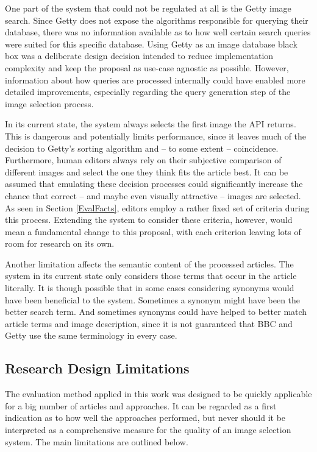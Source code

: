 \documentclass[11pt,a4paper,twoside]{article}
\begin{document}
One part of the system that could not be regulated at all is the Getty image search. Since Getty does not expose the algorithms responsible for querying their database, there was no information available as to how well certain search queries were suited for this specific database. Using Getty as an image database black box was a deliberate design decision intended to reduce implementation complexity and keep the proposal as use-case agnostic as possible. However, information about how queries are processed internally could have enabled more detailed improvements, especially regarding the query generation step of the image selection process.

In its current state, the system always selects the first image the API returns. This is dangerous and potentially limits performance, since it leaves much of the decision to Getty's sorting algorithm and -- to some extent -- coincidence. Furthermore, human editors always rely on their subjective comparison of different images and select the one they think fits the article best. It can be assumed that emulating these decision processes could significantly increase the chance that correct -- and maybe even visually attractive -- images are selected. As seen in Section \ref{EvalFacts}, editors employ a rather fixed set of criteria during this process. Extending the system to consider these criteria, however, would mean a fundamental change to this proposal, with each criterion leaving lots of room for research on its own.

Another limitation affects the semantic content of the processed articles. The system in its current state only considers those terms that occur in the article literally. It is though possible that in some cases considering synonyms would have been beneficial to the system. Sometimes a synonym might have been the better search term. And sometimes synonyms could have helped to better match article terms and image description, since it is not guaranteed that BBC and Getty use the same terminology in every case.

\subsection{Research Design Limitations} \label{LimitsEval}

The evaluation method applied in this work was designed to be quickly applicable for a big number of articles and approaches. It can be regarded as a first indication as to how well the approaches performed, but never should it be interpreted as a comprehensive measure for the quality of an image selection system. The main limitations are outlined below.
\end{document}
